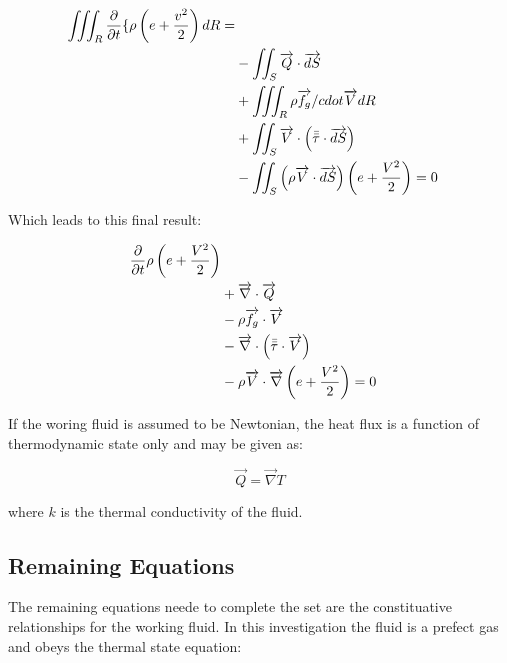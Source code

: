 \begin{equation}
  \begin{split}
  \iiint_R\frac{\partial}{\partial{t}}\{\rho\left(e + \frac{v^2}{2}\right)dR = \\
    & - \iint_S\overrightarrow{Q}\cdot\overrightarrow{dS} \\
    & + \iiint_R\rho\overrightarrow{f_g}/cdot\overrightarrow{V} dR \\ 
    & + \iint_S\overrightarrow{V}\cdot\left(\bar{\bar{\tau}}\cdot\overrightarrow{dS}\right) \\ 
    & - \iint_S\left(\rho\overrightarrow{V} \cdot\overrightarrow{dS}\right)\left(e + \frac{V^2}{2}\right) = 0
  \end{split}
\end{equation}

Which leads to this final result:

\begin{equation}
  \begin{split}
\frac{\partial}{\partial{t}}\rho\left
(e + \frac{V^2}{2}\right) \\
    & + \overrightarrow{\nabla}\cdot\overrightarrow{Q} \\
    & -\rho\overrightarrow{f_g}\cdot\overrightarrow{V} \\
    & - \overrightarrow{\nabla}\cdot\left(\bar{\bar{\tau}}\cdot\overrightarrow{V}\right) \\
    & - \rho\overrightarrow{V}\cdot\overrightarrow{\nabla}\left(e + \frac{V^2}{2}\right) = 0
  \end{split}
\end{equation}

If the woring fluid is assumed to be Newtonian, the heat flux is a function of thermodynamic state only and may be given as:

\begin{equation}
  \overrightarrow{Q} =  \overrightarrow{\nabla}T
\end{equation}

where $k$ is the thermal conductivity of the fluid.

\subsection{Remaining Equations}

The remaining equations neede to complete the set are the constituative relationships for the working fluid. In this investigation the fluid is a prefect gas and obeys the thermal state equation:

